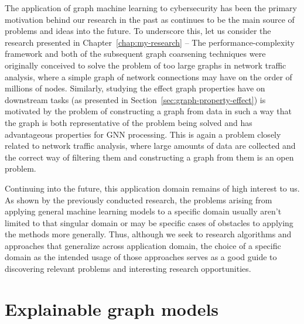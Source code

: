 The application of graph machine learning to cybersecurity has been the primary motivation behind our research in the past as continues to be the main source of problems and ideas into the future. To underscore this, let us consider the research presented in Chapter~\ref{chap:my-research} -- The performance-complexity framework and both of the subsequent graph coarsening techniques were originally conceived to solve the problem of too large graphs in network traffic analysis, where a simple graph of network connections may have on the order of millions of nodes. Similarly, studying the effect graph properties have on downstream tasks (as presented in Section~\ref{sec:graph-property-effect}) is motivated by the problem of constructing a graph from data in such a way that the graph is both representative of the problem being solved and has advantageous properties for GNN processing. This is again a problem closely related to network traffic analysis, where large amounts of data are collected and the correct way of filtering them and constructing a graph from them is an open problem.


Continuing into the future, this application domain remains of high interest to us. As shown by the previously conducted research, the problems arising from applying general machine learning models to a specific domain usually aren't limited to that singular domain or may be specific cases of obstacles to applying the methods more generally. Thus, although we seek to research algorithms and approaches that generalize across application domain, the choice of a specific domain as the intended usage of those approaches serves as a good guide to discovering relevant problems and interesting research opportunities.

\section{Explainable graph models}
